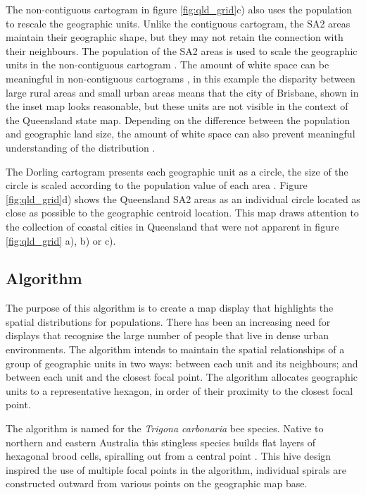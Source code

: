 The non-contiguous cartogram in figure \ref{fig:qld_grid}c) also uses
the population to rescale the geographic units. Unlike the contiguous
cartogram, the SA2 areas maintain their geographic shape, but they may
not retain the connection with their neighbours. The population of the
SA2 areas is used to scale the geographic units in the non-contiguous
cartogram \citep{NAC}. The amount of white space can be meaningful in
non-contiguous cartograms \citep{ECGC}, in this example the disparity
between large rural areas and small urban areas means that the city of
Brisbane, shown in the inset map looks reasonable, but these units are
not visible in the context of the Queensland state map. Depending on the
difference between the population and geographic land size, the amount
of white space can also prevent meaningful understanding of the
distribution \citep{TVSSS}.

The Dorling cartogram presents each geographic unit as a circle, the
size of the circle is scaled according to the population value of each
area \citep{ACTUC}. Figure \ref{fig:qld_grid}d) shows the Queensland SA2
areas as an individual circle located as close as possible to the
geographic centroid location. This map draws attention to the collection
of coastal cities in Queensland that were not apparent in figure
\ref{fig:qld_grid} a), b) or c).

\hypertarget{algorithm}{%
\subsection{Algorithm}\label{algorithm}}

The purpose of this algorithm is to create a map display that highlights
the spatial distributions for populations. There has been an increasing
need for displays that recognise the large number of people that live in
dense urban environments. The algorithm intends to maintain the spatial
relationships of a group of geographic units in two ways: between each
unit and its neighbours; and between each unit and the closest focal
point. The algorithm allocates geographic units to a representative
hexagon, in order of their proximity to the closest focal point.

The algorithm is named for the \emph{Trigona carbonaria} bee species.
Native to northern and eastern Australia this stingless species builds
flat layers of hexagonal brood cells, spiralling out from a central
point \citep{PH}. This hive design inspired the use of multiple focal
points in the algorithm, individual spirals are constructed outward from
various points on the geographic map base.

